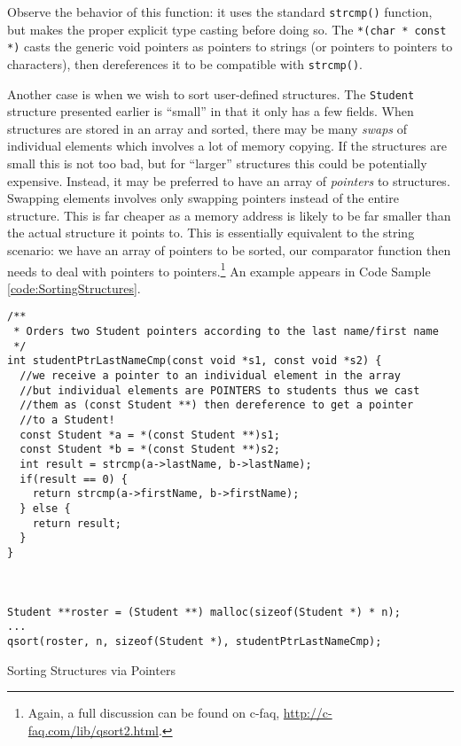 Observe the behavior of this function: it uses the standard 
\texttt{strcmp()} function, but makes the proper explicit type 
casting before doing so.  The \texttt{*(char * const *)} casts 
the generic void pointers as pointers to strings (or pointers to 
pointers to characters), then dereferences it to be compatible
with \texttt{strcmp()}.

Another case is when we wish to sort user-defined structures.  The 
\texttt{Student} structure presented earlier is ``small'' in 
that it only has a few fields.  When structures are stored in an 
array and sorted, there may be many \emph{swaps} of individual 
elements which involves a lot of memory copying.  If the structures 
are small this is not too bad, but for ``larger'' structures this 
could be potentially expensive.  Instead, it may be preferred to 
have an array of \emph{pointers} to structures.  Swapping elements 
involves only swapping pointers instead of the entire structure.  
This is far cheaper as a memory address is likely to be far smaller 
than the actual structure it points to.  This is essentially 
equivalent to the string scenario: we have an array of pointers 
to be sorted, our comparator function then needs to deal with pointers 
to pointers.\footnote{Again, a full discussion can be found on c-faq,
\url{http://c-faq.com/lib/qsort2.html}.}  An example appears in Code 
Sample \ref{code:SortingStructures}.

\begin{listing}[!h]
\begin{verbatim}
/**
 * Orders two Student pointers according to the last name/first name
 */
int studentPtrLastNameCmp(const void *s1, const void *s2) {
  //we receive a pointer to an individual element in the array
  //but individual elements are POINTERS to students thus we cast 
  //them as (const Student **) then dereference to get a pointer 
  //to a Student!
  const Student *a = *(const Student **)s1;
  const Student *b = *(const Student **)s2;
  int result = strcmp(a->lastName, b->lastName);
  if(result == 0) {
    return strcmp(a->firstName, b->firstName);
  } else {
    return result;
  }
}



Student **roster = (Student **) malloc(sizeof(Student *) * n);
...
qsort(roster, n, sizeof(Student *), studentPtrLastNameCmp);
\end{verbatim}
\caption{Sorting Structures via Pointers}
\label{code:SortingStructures}
\end{listing}

